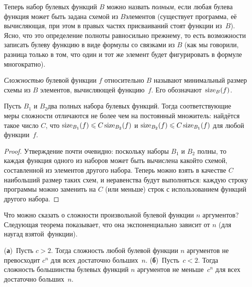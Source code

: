 Теперь
набор булевых функций $B$ можно назвать \emph{полным},%
если любая булева функция может быть задана схемой из
$B$\д элементов (существует программа, её
вычисляющая, при этом в правых частях присваиваний
стоят функции из~$B$). Ясно, что это определение полноты
равносильно прежнему, то есть
возможности записать булеву функцию в виде формулы со
связками из $B$ (как мы говорили, разница
только в том, что один и тот же элемент будет
фигурировать в формуле многократно).

\emph{Сложностью}%
%
булевой функции $f$ относительно
$B$ называют минимальный размер схемы из $B$\д
элементов, вычисляющей функцию~$f$. Его
обозначают~$\operatorname{size}_B(f)$.

\begin{theorem}
        \label{size-invariant}
Пусть $B_1$ и $B_2$\т два полных набора булевых
функций. Тогда соответствующие меры сложности
отличаются не более чем на постоянный множитель:
найдётся такое число $C$, что $\size_{B_1}(f)\hm\le
C\size_{B_2}(f)$ и $\size_{B_2}(f)\hm\le C\size_{B_1}(f)$
для любой функции~$f$.
\end{theorem}

\begin{proof}
Утверждение почти очевидно: поскольку наборы $B_1$ и
$B_2$ полны, то каждая функция одного из наборов
может быть вычислена какой\д то схемой,
составленной из элементов другого набора. Теперь можно
взять в качестве $C$ наибольший размер таких схем,
и неравенства будут выполняться: каждую строку
программы можно заменить на $C$ (или меньше) строк с
использованием функций другого набора.
\end{proof}

Что можно сказать о сложности произвольной булевой функции $n$
аргументов? Следующая теорема показывает, что она
экспоненциально зависит от $n$ (для  наугад взятой\
функции).%
%

\begin{theorem}
        \label{generic-size}
(\textbf{а})~Пусть $c>2$. Тогда сложность любой булевой функции
$n$ аргументов не превосходит $c^n$ для всех достаточно
больших~$n$.
(\textbf{б})~Пусть~$c<2$. Тогда
сложность большинства булевых функций $n$ аргументов
не меньше~$c^n$ для всех достаточно
больших~$n$.
\end{theorem}

